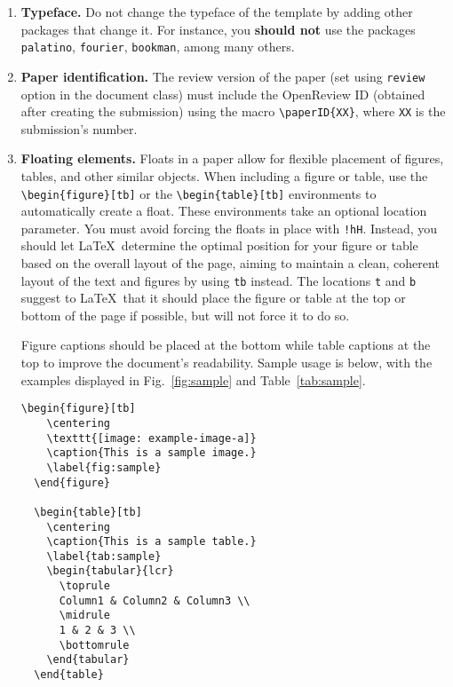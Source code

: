 \documentclass[fullpaper]{nldl}
\begin{document}
\begin{enumerate}[leftmargin=*]

\item \textbf{Typeface.}
Do not change the typeface of the template by adding other packages that change it.
For instance, you \textbf{should not} use the packages \verb|palatino|, \verb|fourier|, \verb|bookman|, among many others.

\item \textbf{Paper identification.}
The review version of the paper (set using \verb|review| option in the document class) must include the OpenReview ID (obtained after creating the submission) using the macro \verb|\paperID{XX}|, where \verb|XX| is the submission's number.

\item \textbf{Floating elements.}
Floats in a paper allow for flexible placement of figures, tables, and other similar objects.
When including a figure or table, use the \verb|\begin{figure}[tb]| or the \verb|\begin{table}[tb]| environments to automatically create a float.
These environments take an optional location parameter.
You must avoid forcing the floats in place with \verb|!hH|.
Instead, you should let \LaTeX\ determine the optimal position for your figure or table based on the overall layout of the page, aiming to maintain a clean, coherent layout of the text and figures by using \verb|tb| instead.
The locations \verb|t| and \verb|b| suggest to \LaTeX\ that it should place the figure or table at the top or bottom of the page if possible, but will not force it to do so.

Figure captions should be placed at the bottom while table captions at the top to improve the document's readability.
Sample usage is below, with the examples displayed in Fig.~\ref{fig:sample} and Table~\ref{tab:sample}.
\begin{lstlisting}[gobble=2]
  \begin{figure}[tb]
    \centering
    \texttt{[image: example-image-a]}
    \caption{This is a sample image.}
    \label{fig:sample}
  \end{figure}

  \begin{table}[tb]
    \centering
    \caption{This is a sample table.}
    \label{tab:sample}
    \begin{tabular}{lcr}
      \toprule
      Column1 & Column2 & Column3 \\
      \midrule
      1 & 2 & 3 \\
      \bottomrule
    \end{tabular}
  \end{table}
\end{lstlisting}


\end{enumerate}
\end{document}
